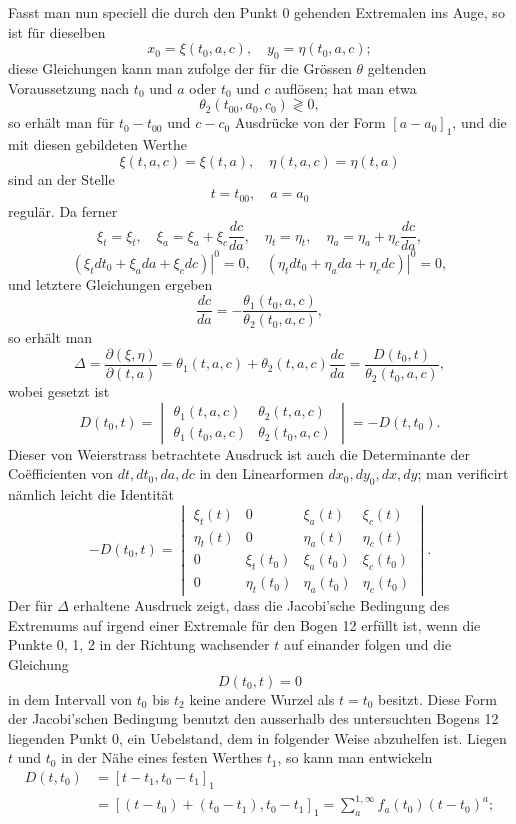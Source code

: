 \documentclass[11pt,a4paper,leqno]{article}
\begin{document}
Fasst man nun speciell die durch den Punkt 0 gehenden Extremalen ins Auge, so ist für dieselben
\[
x_0=\xi(t_0,a,c),
\quad
y_0=\eta(t_0,a,c);
\]
diese Gleichungen kann man zufolge der für die Grössen $\theta$ geltenden Voraussetzung nach $t_0$ und $a$ oder $t_0$ und $c$ auflösen; hat man etwa
\[
\theta_2(t_{00},a_0,c_0)\gtrless0,
\]
so erhält man für $t_0-t_{00}$ und $c-c_0$ Ausdrücke von der Form $[a-a_0]_1$, und die mit diesen gebildeten Werthe
\[
\xi(t,a,c)=\xi(t,a),
\quad
\eta(t,a,c)=\eta(t,a)
\]
sind an der Stelle
\[
t=t_{00},
\quad
a=a_0
\]
regulär. Da ferner
\[
\xi_t=\xi_t,
\quad
\xi_a=\xi_a+\xi_c\frac{dc}{da},
\quad
\eta_t=\eta_t,
\quad
\eta_a=\eta_a+\eta_c\frac{dc}{da},
\]
\[
\left.(\xi_tdt_0+\xi_ada+\xi_cdc)\right|^0=0,
\quad
\left.(\eta_tdt_0+\eta_ada+\eta_cdc)\right|^0=0,
\]
und letztere Gleichungen ergeben
\[
\frac{dc}{da}=-\frac{\theta_1(t_0,a,c)}{\theta_2(t_0,a,c)},
\]
so erhält man
\[
\Delta=\frac{\partial(\xi,\eta)}{\partial(t,a)}
=\theta_1(t,a,c)+\theta_2(t,a,c)\frac{dc}{da}
=\frac{D(t_0,t)}{\theta_2(t_0,a,c)},
\]
wobei gesetzt ist
\[
D(t_0,t)=
\begin{vmatrix}
\theta_1(t,a,c)&\theta_2(t,a,c)\\
\theta_1(t_0,a,c)&\theta_2(t_0,a,c)
\end{vmatrix}
=-D(t,t_0).
\]
Dieser von Weierstrass betrachtete Ausdruck ist auch die Determinante der Coëfficienten von $dt,dt_0,da,dc$ in den Linearformen $dx_0,dy_0,dx,dy$; man verificirt nämlich leicht die Identität
\[
-D(t_0,t)=
\begin{vmatrix}
\xi_t(t)&0&\xi_a(t)&\xi_c(t)\\
\eta_t(t)&0&\eta_a(t)&\eta_c(t)\\
0&\xi_t(t_0)&\xi_a(t_0)&\xi_c(t_0)\\
0&\eta_t(t_0)&\eta_a(t_0)&\eta_c(t_0)
\end{vmatrix}.
\]
Der für $\Delta$ erhaltene Ausdruck zeigt, dass die Jacobi'sche Bedingung des Extremums auf irgend einer Extremale für den Bogen 12 erfüllt ist, wenn die Punkte 0, 1, 2 in der Richtung wachsender $t$ auf einander folgen und die Gleichung
\[
D(t_0,t)=0
\]
in dem Intervall von $t_0$ bis $t_2$ keine andere Wurzel als $t=t_0$ besitzt. Diese Form der Jacobi'schen Bedingung benutzt den ausserhalb des untersuchten Bogens 12 liegenden Punkt 0, ein Uebelstand, dem in folgender Weise abzuhelfen ist. Liegen $t$ und $t_0$ in der Nähe eines festen Werthes $t_1$, so kann man entwickeln
\begin{equation}\tag{103}
\begin{aligned}
D(t,t_0)&=[t-t_1,t_0-t_1]_1\\
&=[(t-t_0)+(t_0-t_1),t_0-t_1]_1
=\sum_a^{1,\infty}f_a(t_0)(t-t_0)^a;
\end{aligned}
\end{equation}
\end{document}
